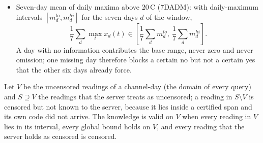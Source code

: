\begin{itemize}
\begin{equation}
  \frac{x(b)}{x(a)} \in \left[\frac{L_b}{U_a},\ \frac{U_b}{L_a}\right],
  \label{eq:ratio}
  \end{equation}
  and both ends are attained. A certain no holds when every pair is within 10\% for all values of the intervals. A certain yes holds when no assignment of readings within their intervals keeps every pair within 10\%; for one lag, the pairs form chains, and the set of readings reachable under ``all pairs within 10\%'' is propagated along each chain until it is empty. The pairwise rule ``some single pair is certainly changed'' is sound but incomplete (readings 100, an interval of 100 to 130, and 130 always contain a change, but no pair is certain); therefore, the chain rule is used. A rate witness decides the query directly: Eq.~(\ref{eq:ratio}) applied to its two cells answers 1 when the ratio interval lies entirely outside $[0.9, 1.1]$, and 0 when it lies inside, because the witness pair realises the largest change of the day.
  \item Seven-day mean of daily maxima above 20\,\textdegree C (7DADM): with daily-maximum intervals $[m^{lo}_d, m^{hi}_d]$ for the seven days $d$ of the window,
  \begin{equation}
  \frac{1}{7}\sum_{d} \max_t x_d(t) \in \left[\frac{1}{7}\sum_{d} m^{lo}_d,\ \frac{1}{7}\sum_{d} m^{hi}_d\right].
  \label{eq:7dadm}
  \end{equation}
  A day with no information contributes the base range, never zero and never omission; one missing day therefore blocks a certain no but not a certain yes that the other six days already force.
\end{itemize}

Let $V$ be the uncensored readings of a channel-day (the domain of every query) and $S \supseteq V$ the readings that the server treats as uncensored; a reading in $S \setminus V$ is censored but not known to the server, because it lies inside a certified span and its own code did not arrive. The knowledge is valid on $V$ when every reading in $V$ lies in its interval, every global bound holds on $V$, and every reading that the server holds as censored is censored.

